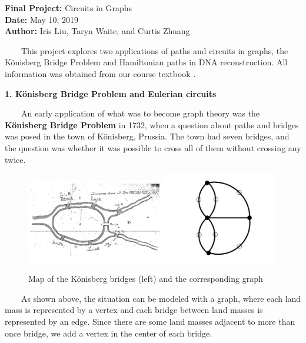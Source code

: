 

\newtheorem{innercustomthm}{Theorem}
\newenvironment{customthm}[1]
  {\renewcommand\theinnercustomthm{#1}\innercustomthm}
  {\endinnercustomthm}
\usepackage{float}
\usepackage{caption}
 


\textbf{Final Project:} Circuits in Graphs \\
\textbf{Date:} May 10, 2019 \\
\textbf{Author:} Iris Liu, Taryn Waite, and Curtis Zhuang

$\qquad$This project explores two applications of paths and circuits in graphs, the K\"{o}nisberg Bridge Problem and Hamiltonian paths in DNA reconstruction. All information was obtained from our course textbook \cite{Taylor}. 

\textbf{1. K\"{o}nisberg Bridge Problem and Eulerian circuits}

    $\qquad$An early application of what was to become graph theory was the \textbf{K\"{o}nisberg Bridge Problem} in 1732, when a question about paths and bridges was posed in the town of K\"{o}nisberg, Prussia. The town had seven bridges, and the question was whether it was possible to cross all of them without crossing any twice. 
    
    
    \begin{figure}[h]
    \includegraphics[width=60mm]{bridges.jpg} 
    \includegraphics[width=50mm]{bridge_graph.jpg} 
    \caption*{Map of the K\"{o}nisberg bridges (left) and the corresponding graph \cite{Taylor}} 
    \end{figure}

	$\qquad$As shown above, the situation can be modeled with a graph, where each land mass is represented by a vertex and each bridge between land masses is represented by an edge. Since there are some land masses adjacent to more than once bridge, we add a vertex in the center of each bridge.

